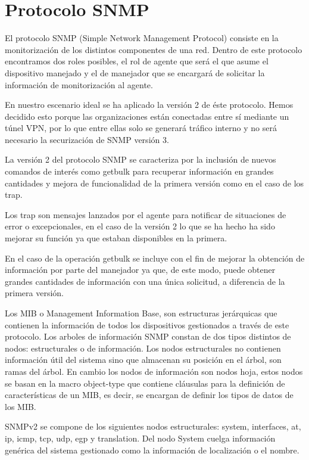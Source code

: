 \documentclass[a4paper]{article}
\begin{document}
\newpage

\section{Protocolo SNMP}
El protocolo SNMP (Simple Network Management Protocol) consiste en la monitorización de los distintos componentes de una red. Dentro de este protocolo encontramos dos roles posibles, el rol de agente que será el que asume el dispositivo manejado y el de manejador que se encargará de solicitar la información de monitorización al agente.


 En nuestro escenario ideal se ha aplicado la versión 2 de éste protocolo. Hemos decidido esto porque las organizaciones están conectadas entre sí mediante un túnel VPN, por lo que entre ellas solo se generará tráfico interno y no será necesario la securización de SNMP versión 3. 


 La versión 2 del protocolo SNMP se caracteriza por la inclusión de nuevos comandos de interés como getbulk para recuperar información en grandes cantidades y mejora de funcionalidad de la primera versión como en el caso de los trap.


 Los trap son mensajes lanzados por el agente para notificar de situaciones de error o excepcionales, en el caso de la versión 2 lo que se ha hecho ha sido mejorar su función
ya que estaban disponibles en la primera.


 En el caso de la operación getbulk se incluye con el fin de mejorar la obtención de información por parte del manejador ya que, de este modo, puede obtener grandes cantidades de información con una única solicitud, a diferencia de la primera versión.


 Los MIB o Management Information Base, son estructuras jerárquicas que contienen la información de todos los dispositivos gestionados a través de este protocolo. Los arboles de información SNMP constan de dos tipos distintos de nodos: estructurales o de información. Los nodos estructurales no contienen información útil del sistema sino que almacenan su posición en el árbol, son ramas del árbol. En cambio los nodos de información son nodos hoja, estos nodos se basan en la macro object-type que contiene cláusulas para la definición de características de un MIB, es decir, se encargan de definir los tipos de datos de los MIB.


 SNMPv2 se compone de los siguientes nodos estructurales: system, interfaces, at, ip, icmp, tcp, udp, egp y translation.
Del nodo System cuelga información genérica del sistema gestionado como la información de localización o el nombre. 
\end{document}
